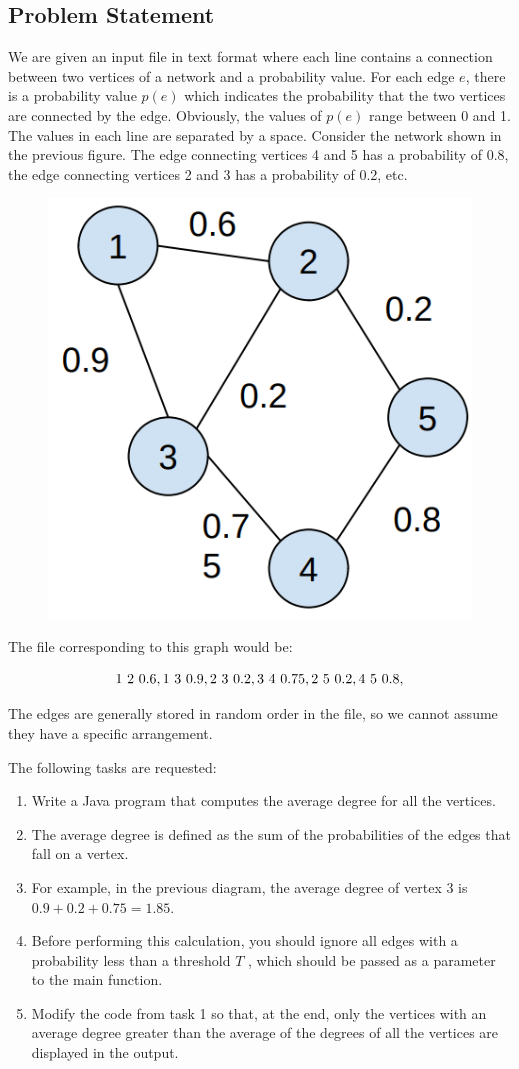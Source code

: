 \documentclass[acmlarge]{acmart}
\begin{document}
  \subsection{Problem Statement}
  We are given an input file in text format where each line contains a connection between two vertices of a network and a
  probability value.
  For each edge \( e \), there is a probability value \( p(e) \) which indicates the probability that the two vertices are
  connected by the edge.
  Obviously, the values of \( p(e) \) range between 0 and 1.
  The values in each line are separated by a space.
  Consider the network shown in the previous figure.
  The edge connecting vertices 4 and 5 has a probability of
  0.8, the edge connecting vertices 2 and 3 has a probability of 0.2, etc.

  \begin{figure}[h]
    \centering
    \includegraphics[width=0.25\linewidth]{figures/graph}
  \end{figure}

  The file corresponding to this graph would be:

  \[
    1 \ 2 \ 0.6, \\
    1 \ 3 \ 0.9, \\
    2 \ 3 \ 0.2, \\
    3 \ 4 \ 0.75, \\
    2 \ 5 \ 0.2, \\
    4 \ 5 \ 0.8,
  \]

  The edges are generally stored in random order in the file, so we cannot assume they have a specific arrangement.

  The following tasks are requested:

  \begin{enumerate}
    \item Write a Java program that computes the average degree for all the vertices.
    \item The average degree is defined as the sum of the probabilities of the edges that fall on a vertex.
    \item For example, in the previous diagram, the average degree of vertex 3 is \( 0.9 + 0.2 + 0.75 = 1.85 \).
    \item Before performing this calculation, you should ignore all edges with a probability less than a threshold \( T \)
    , which should be passed as a parameter to the main function.
    \item Modify the code from task 1 so that, at the end, only the vertices with an average degree greater than the
    average of the degrees of all the vertices are displayed in the output.

  \end{enumerate}
\end{document}
